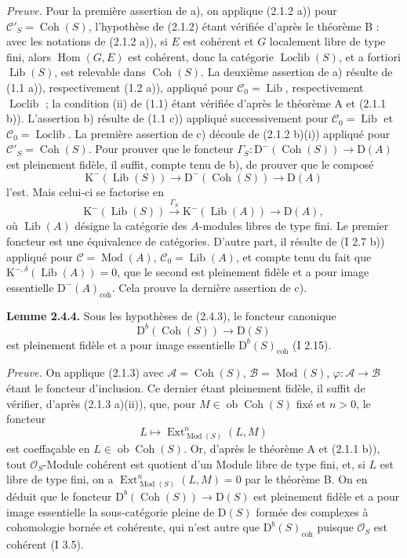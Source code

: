 \documentclass[11pt]{article}
\providecommand{\Mod}{\operatorname{Mod}}
\providecommand{\Lib}{\operatorname{Lib}}
\providecommand{\Loclib}{\operatorname{Loclib}}
\providecommand{\Coh}{\operatorname{Coh}}
\providecommand{\Ext}{\operatorname{Ext}}
\providecommand{\Ob}{\operatorname{ob}}
\providecommand{\coh}{\operatorname{coh}}
\begin{document}
\emph{Preuve.} Pour la première assertion de a), on applique (2.1.2 a)) pour $\mathcal C'_S=\Coh(S)$, l'hypothèse de (2.1.2) étant vérifiée d'après le théorème B : avec les notations de (2.1.2 a)), si $E$ est cohérent et $G$ localement libre de type fini, alors $\operatorname{Hom}(G,E)$ est cohérent, donc la catégorie $\Loclib(S)$, et a fortiori $\Lib(S)$, est relevable dans $\Coh(S)$. La deuxième assertion de a) résulte de (1.1 a)), respectivement (1.2 a)), appliqué pour $\mathcal C_0=\Lib$, respectivement $\Loclib$ ; la condition (ii) de (1.1) étant vérifiée d'après le théorème A et (2.1.1 b)). L'assertion b) résulte de (1.1 c)) appliqué successivement pour $\mathcal C_0=\Lib$ et $\mathcal C_0=\Loclib$. La première assertion de c) découle de (2.1.2 b)(i)) appliqué pour $\mathcal C'_S=\Coh(S)$. Pour prouver que le foncteur $\Gamma_S:\mathrm D^{-}(\Coh(S))\to\mathrm D(A)$ est pleinement fidèle, il suffit, compte tenu de b), de prouver que le composé
\[
\mathrm K^{-}(\Lib(S))\longrightarrow\mathrm D^{-}(\Coh(S))\longrightarrow\mathrm D(A)
\]
l'est. Mais celui-ci se factorise en
\[
\mathrm K^{-}(\Lib(S))\xrightarrow{\Gamma_S}\mathrm K^{-}(\Lib(A))\longrightarrow\mathrm D(A),
\]
où $\Lib(A)$ désigne la catégorie des $A$-modules libres de type fini. Le premier foncteur est une équivalence de catégories. D'autre part, il résulte de (I 2.7 b)) appliqué pour $\mathcal C=\Mod(A)$, $\mathcal C_0=\Lib(A)$, et compte tenu du fait que $\mathrm K^{-,\delta}(\Lib(A))=0$, que le second est pleinement fidèle et a pour image essentielle $\mathrm D^{-}(A)_{\coh}$. Cela prouve la dernière assertion de c).

\textbf{Lemme 2.4.4.} Sous les hypothèses de (2.4.3), le foncteur canonique
\[
\mathrm D^b(\Coh(S))\longrightarrow\mathrm D(S)
\]
est pleinement fidèle et a pour image essentielle $\mathrm D^b(S)_{\coh}$ (I 2.15).

\emph{Preuve.} On applique (2.1.3) avec $\mathcal A=\Coh(S)$, $\mathcal B=\Mod(S)$, $\varphi:\mathcal A\to\mathcal B$ étant le foncteur d'inclusion. Ce dernier étant pleinement fidèle, il suffit de vérifier, d'après (2.1.3 a)(ii)), que, pour $M\in\Ob\Coh(S)$ fixé et $n>0$, le foncteur
\[
L\longmapsto \Ext^n_{\Mod(S)}(L,M)
\]
est coeffaçable en $L\in\Ob\Coh(S)$. Or, d'après le théorème A et (2.1.1 b)), tout $\mathcal O_S$-Module cohérent est quotient d'un Module libre de type fini, et, si $L$ est libre de type fini, on a $\Ext^n_{\Mod(S)}(L,M)=0$ par le théorème B. On en déduit que le foncteur $\mathrm D^b(\Coh(S))\to\mathrm D(S)$ est pleinement fidèle et a pour image essentielle la sous-catégorie pleine de $\mathrm D(S)$ formée des complexes à cohomologie bornée et cohérente, qui n'est autre que $\mathrm D^b(S)_{\coh}$ puisque $\mathcal O_S$ est cohérent (I 3.5).
\end{document}
